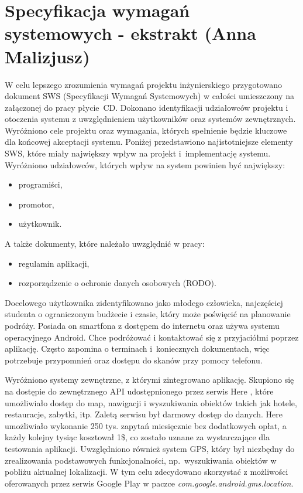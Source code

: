 \documentclass[10pt,twoside,a4paper]{report}
\begin{document}
\chapter{Specyfikacja wymagań systemowych - ekstrakt (Anna Malizjusz)}
\par W celu lepszego zrozumienia wymagań projektu inżynierskiego przygotowano dokument SWS (Specyfikacji Wymagań Systemowych) w całości umieszczony na załączonej do pracy płycie~CD. Dokonano identyfikacji udziałowców projektu i otoczenia systemu z uwzględnieniem użytkowników oraz systemów zewnętrznych. Wyróżniono cele projektu oraz wymagania, których spełnienie będzie kluczowe dla końcowej akceptacji systemu. Poniżej przedstawiono najistotniejsze elementy SWS, które miały największy wpływ na projekt i~implementację systemu.
\newline
\newline
\noindent Wyróżniono udziałowców, których wpływ na system powinien być największy:

\begin{itemize}
\item programiści,
\item promotor,
\item użytkownik.
\end{itemize}

\noindent A także dokumenty, które należało uwzględnić w pracy:

\begin{itemize}
\item regulamin aplikacji,
\item rozporządzenie o ochronie danych osobowych (RODO).
\end{itemize}

\par Docelowego użytkownika zidentyfikowano jako młodego człowieka, najczęściej studenta o ograniczonym budżecie i czasie, który może poświęcić na planowanie podróży. Posiada on smartfona z dostępem do internetu oraz używa systemu operacyjnego Android. Chce podróżować i kontaktować się z przyjaciółmi poprzez aplikację. Często zapomina o terminach i~koniecznych dokumentach, więc potrzebuje przypomnień oraz dostępu do skanów przy pomocy telefonu.

\par Wyróżniono systemy zewnętrzne, z którymi zintegrowano aplikację. Skupiono się na dostępie do zewnętrznego API udostępnionego przez serwis Here \cite{Here}, które umożliwiało dostęp do map, nawigacji i wyszukiwania obiektów takich jak hotele, restauracje, zabytki, itp. Zaletą serwisu był darmowy dostęp do danych. Here umożliwiało wykonanie 250 tys. zapytań miesięcznie bez dodatkowych opłat, a każdy kolejny tysiąc kosztował 1\$, co zostało uznane za wystarczające dla testowania aplikacji. Uwzględniono również system GPS, który był niezbędny do zrealizowania podstawowych funkcjonalności, np.~wyszukiwania obiektów w pobliżu aktualnej lokalizacji. W tym celu zdecydowano skorzystać z możliwości oferowanych przez serwis Google Play w paczce \textit{com.google.android.gms.location}\cite{gms.location}.
\end{document}
